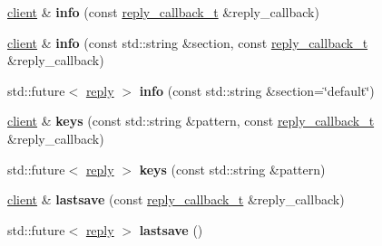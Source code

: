 \begin{DoxyCompactItemize}
\mbox{\hyperlink{classcpp__redis_1_1client}{client}} \& {\bfseries info} (const \mbox{\hyperlink{classcpp__redis_1_1client_af7a65eb21aa25230bfbb0b0203c4fc04}{reply\+\_\+callback\+\_\+t}} \&reply\+\_\+callback)
\item 
\mbox{\label{classcpp__redis_1_1client_af276159a3938c97e5318dff39a9084ae}} 
\mbox{\hyperlink{classcpp__redis_1_1client}{client}} \& {\bfseries info} (const std\+::string \&section, const \mbox{\hyperlink{classcpp__redis_1_1client_af7a65eb21aa25230bfbb0b0203c4fc04}{reply\+\_\+callback\+\_\+t}} \&reply\+\_\+callback)
\item 
\mbox{\label{classcpp__redis_1_1client_aa0186723d51c8b3c92979537e8ad43b9}} 
std\+::future$<$ \mbox{\hyperlink{classcpp__redis_1_1reply}{reply}} $>$ {\bfseries info} (const std\+::string \&section=\char`\"{}default\char`\"{})
\item 
\mbox{\label{classcpp__redis_1_1client_acb7845a206b2321e6919c2f38282c322}} 
\mbox{\hyperlink{classcpp__redis_1_1client}{client}} \& {\bfseries keys} (const std\+::string \&pattern, const \mbox{\hyperlink{classcpp__redis_1_1client_af7a65eb21aa25230bfbb0b0203c4fc04}{reply\+\_\+callback\+\_\+t}} \&reply\+\_\+callback)
\item 
\mbox{\label{classcpp__redis_1_1client_a1c0804cab9251acde742e725d0af6cbf}} 
std\+::future$<$ \mbox{\hyperlink{classcpp__redis_1_1reply}{reply}} $>$ {\bfseries keys} (const std\+::string \&pattern)
\item 
\mbox{\label{classcpp__redis_1_1client_a3b25eaf2691051156748abb69e1b0317}} 
\mbox{\hyperlink{classcpp__redis_1_1client}{client}} \& {\bfseries lastsave} (const \mbox{\hyperlink{classcpp__redis_1_1client_af7a65eb21aa25230bfbb0b0203c4fc04}{reply\+\_\+callback\+\_\+t}} \&reply\+\_\+callback)
\item 
\mbox{\label{classcpp__redis_1_1client_a6b550a4ecf6eb33abffd664c3124b4f9}} 
std\+::future$<$ \mbox{\hyperlink{classcpp__redis_1_1reply}{reply}} $>$ {\bfseries lastsave} ()
\item 
\mbox{\label{classcpp__redis_1_1client_afa409d5b28466837137dfb12c3554070}} 

\end{DoxyCompactItemize}
